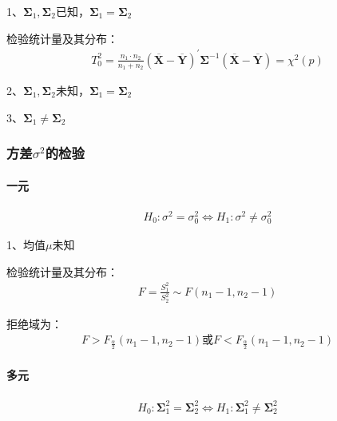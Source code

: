 \documentclass[12pt]{book}
\begin{document}
1、$\bm{\Sigma}_1,\bm{\Sigma}_2$已知，$\bm{\Sigma}_1=\bm{\Sigma}_2$

检验统计量及其分布：
\begin{gather*}
    T_0^2 =\frac{n_1\cdot n_2}{n_1+n_2}\left(\overline{\bm{X}}-\overline{\bm{Y}}\right)^\prime\bm{\Sigma}^{-1}\left(\overline{\bm{X}}-\overline{\bm{Y}}\right)=\chi^2\left(p\right)
\end{gather*}

2、$\bm{\Sigma}_1,\bm{\Sigma}_2$未知，$\bm{\Sigma}_1=\bm{\Sigma}_2$

3、$\bm{\Sigma}_1\neq\bm{\Sigma}_2$

\subsubsection{方差$\sigma^2$的检验}

\paragraph{一元}

\begin{gather*}
    H_0:\sigma^2=\sigma_0^2\Leftrightarrow H_1:\sigma^2\neq\sigma_0^2
\end{gather*}


1、均值$\mu$未知

检验统计量及其分布：
\begin{gather*}
    F=\frac{S_1^2}{S_2^2}\sim F(n_1-1,n_2-1)
\end{gather*}


拒绝域为：
\begin{gather*}
    F>F_{\frac{\alpha}{2}}(n_1-1,n_2-1)
    \text{或}
    F<F_{\frac{\alpha}{2}}(n_1-1,n_2-1)
\end{gather*}


\paragraph{多元}

\begin{gather*}
    H_0:\bm{\Sigma}_1^2=\bm{\Sigma}_2^2	\Leftrightarrow H_1:\bm{\Sigma}_1^2\neq\bm{\Sigma}_2^2
\end{gather*}
\end{document}
